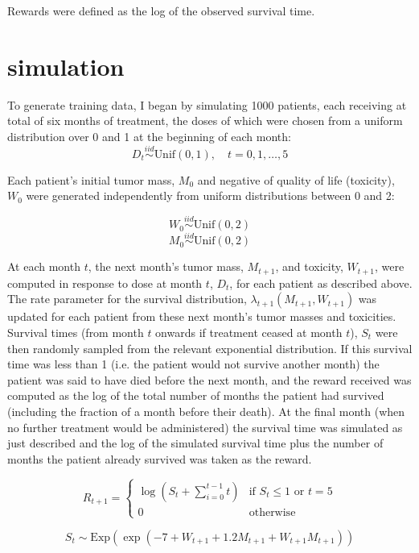 \documentclass[12pt]{article}
\begin{document}
Rewards were defined as the log of the observed survival time.


\section{simulation} %
\label{sec:simulation}

To generate training data, I began by simulating 1000 patients, each receiving at total of six months of treatment, the doses of which were chosen from a uniform distribution over 0 and 1 at the beginning of each month:
\[
  D_{t} \overset{iid}{\sim} \text{Unif}(0, 1), \quad t = 0, 1, \ldots, 5
\]

Each patient's initial tumor mass, $M_{0}$ and negative of quality of life (toxicity), $W_{0}$ were generated independently from uniform distributions between 0 and 2:

\[
  W_{0} \overset{iid}{\sim} \text{Unif}(0, 2)
\]
\[
  M_{0} \overset{iid}{\sim} \text{Unif}(0, 2)
\]

At each month $t$, the next month's tumor mass, $M_{t + 1}$, and toxicity, $W_{t + 1}$, were computed in response to dose at month $t$, $D_{t}$, for each patient as described above. The rate parameter for the survival distribution, $\lambda_{t+1}(M_{t + 1}, W_{t + 1})$ was updated for each patient from these next month's tumor masses and toxicities. Survival times (from month $t$ onwards if treatment ceased at month $t$), $S_{t}$ were then randomly sampled from the relevant exponential distribution. If this survival time was less than 1 (i.e. the patient would not survive another month) the patient was said to have died before the next month, and the reward received was computed as the log of the total number of months the patient had survived (including the fraction of a month before their death). At the final month (when no further treatment would be administered) the survival time was simulated as just described and the log of the simulated survival time plus the number of months the patient already survived was taken as the reward.

\[
  R_{t + 1} = \begin{cases}
    \log(S_{t} + \sum_{i = 0}^{t - 1} t) & \text{if } S_{t} \leq 1 \text{ or } t = 5 \\
    0 & \text{otherwise}
  \end{cases}
\]

\[
  S_{t} \sim \text{Exp}(\exp(-7 + W_{t+1} + 1.2 M_{t+1} + W_{t+1} M_{t+1}))
\]




\end{document}
